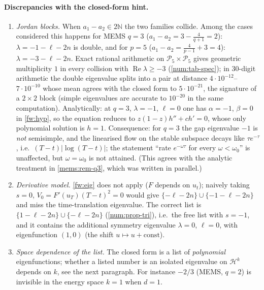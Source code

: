 \paragraph{Discrepancies with the closed-form hint.}
\begin{enumerate}[label=(D\arabic*),leftmargin=2.2em,itemsep=1pt]
\item\label{num:D-jordan} \emph{Jordan blocks.} When $a_1-a_2\in2\mathbb N$
  the two families collide. Among the cases considered this happens for MEMS
  $q=3$ ($a_1-a_2=3-\frac4{q+1}=2$): $\lambda=-1-\ell-2n$ is double, and for
  $p=5$ ($a_1-a_2=\frac4{p-1}+3=4$): $\lambda=-3-\ell-2n$. Exact rational
  arithmetic on $\mathcal P_5\times\mathcal P_5$ gives geometric multiplicity
  $1$ in every collision with $\operatorname{Re}\lambda\ge-3$
  (\cref{num:tab-spec}); in $30$-digit arithmetic the double eigenvalue splits
  into a pair at distance $4\cdot10^{-12}$--$7\cdot10^{-10}$ whose mean agrees with
  the closed form to $5\cdot10^{-21}$, the signature of a $2\times2$ block (simple
  eigenvalues are accurate to $10^{-20}$ in the same computation).
  Analytically: at $q=3$, $\lambda=-1$, $\ell=0$ one has $\alpha=-1$, $\beta=0$
  in \eqref{fw:hyp}, so the equation reduces to $z(1-z)h''+ch'=0$, whose only
  polynomial solution is $h=1$. Consequence: for $q=3$ the gap eigenvalue
  $-1$ is \emph{not} semisimple, and the linearised flow on the stable
  subspace decays like $\tau e^{-\tau}$, i.e.\ $(T-t)|\log(T-t)|$; the statement
  ``rate $e^{-\omega\tau}$ for every $\omega<\omega_0$'' is unaffected, but
  $\omega=\omega_0$ is not attained. (This agrees with the analytic treatment
  in \cref{mems:rem-q3}, which was written in parallel.)
\item\label{num:D-deriv} \emph{Derivative model.} \eqref{fw:eig} does not
  apply ($F$ depends on $u_t$); naively taking $s=0$, $V_0=F'(u_T)(T-t)^2=0$ would give
  $\{-\ell-2n\}\cup\{-1-\ell-2n\}$ and miss the time-translation eigenvalue.
  The correct list is $\{1-\ell-2n\}\cup\{-\ell-2n\}$ (\cref{num:prop-tri}),
  i.e.\ the free list with $s=-1$, and it contains the additional symmetry
  eigenvalue $\lambda=0$, $\ell=0$, with eigenfunction $(1,0)$ (the shift
  $u\mapsto u+\text{const}$).
\item\label{num:D-buried} \emph{Space dependence of the list.} The closed
  form is a list of \emph{polynomial} eigenfunctions; whether a listed number
  is an isolated eigenvalue on $\mathcal H^k$ depends on $k$, see the next
  paragraph. For instance $-2/3$ (MEMS, $q=2$) is invisible in the energy
  space $k=1$ when $d=1$.
\end{enumerate}

